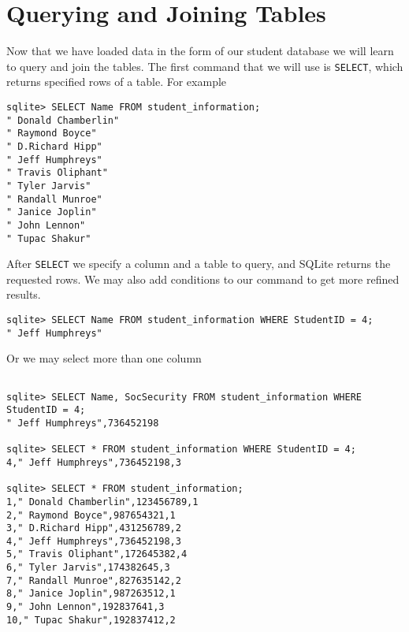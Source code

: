 \begin{comment}
Unfortunatly sqlite can only time SQL queries
.import isn't one
\begin{problem}

Using python, write a program that will accepts a number of rows and returns a 10 column matrix with the specified number of rows and write it to a file with each column separated by commas.  The first column should be in ascending numeric order, but the others should have random numbers in them.  Generate matrices with 100, 1000, 10000, and 100000 rows.  Load each into a different table in a new database and time the load operation.  How does the time increase?

\end{problem}
\end{comment}

\section{Querying and Joining Tables}

Now that we have loaded data in the form of our student database we will learn to query and join the tables.  The first command that we will use is {\tt SELECT}, which returns specified rows of a table.  For example

\begin{lstlisting}
sqlite> SELECT Name FROM student_information;
" Donald Chamberlin"
" Raymond Boyce"
" D.Richard Hipp"
" Jeff Humphreys"
" Travis Oliphant"
" Tyler Jarvis"
" Randall Munroe"
" Janice Joplin"
" John Lennon"
" Tupac Shakur"
\end{lstlisting}

After {\tt SELECT} we specify a column and a table to query, and SQLite returns the requested rows.  We may also add conditions to our command to get more refined results.

\begin{lstlisting}
sqlite> SELECT Name FROM student_information WHERE StudentID = 4;
" Jeff Humphreys"
\end{lstlisting}

Or we may select more than one column

\begin{lstlisting}

sqlite> SELECT Name, SocSecurity FROM student_information WHERE StudentID = 4;
" Jeff Humphreys",736452198

sqlite> SELECT * FROM student_information WHERE StudentID = 4;
4," Jeff Humphreys",736452198,3

sqlite> SELECT * FROM student_information;
1," Donald Chamberlin",123456789,1
2," Raymond Boyce",987654321,1
3," D.Richard Hipp",431256789,2
4," Jeff Humphreys",736452198,3
5," Travis Oliphant",172645382,4
6," Tyler Jarvis",174382645,3
7," Randall Munroe",827635142,2
8," Janice Joplin",987263512,1
9," John Lennon",192837641,3
10," Tupac Shakur",192837412,2

\end{lstlisting}


